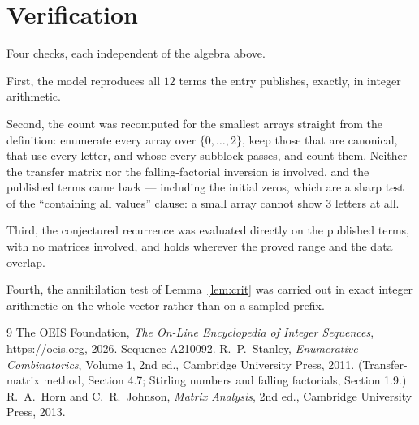 \documentclass[11pt,a4paper]{article}
\theoremstyle{plain}
\theoremstyle{definition}
\begin{document}
\section{Verification}

Four checks, each independent of the algebra above.

First, the model reproduces all $12$ terms the entry publishes, exactly, in integer
arithmetic.

Second, the count was recomputed for the smallest arrays straight from the definition:
enumerate every array over $\{0,\dots,2\}$, keep those that are canonical, that use every
letter, and whose every subblock passes, and count them. Neither the transfer matrix nor the
falling-factorial inversion is involved, and the published terms came back --- including the
initial zeros, which are a sharp test of the ``containing all values'' clause: a small array
cannot show $3$ letters at all.

Third, the conjectured recurrence was evaluated directly on the published terms, with no
matrices involved, and holds wherever the proved range and the data overlap.

Fourth, the annihilation test of Lemma~\ref{lem:crit} was carried out in exact integer
arithmetic on the whole vector rather than on a sampled prefix.

\begin{thebibliography}{9}
 The OEIS Foundation, \emph{The On-Line Encyclopedia of Integer
Sequences}, \url{https://oeis.org}, 2026. Sequence A210092.
 R.~P.~Stanley, \emph{Enumerative Combinatorics}, Volume 1, 2nd ed.,
Cambridge University Press, 2011. (Transfer-matrix method, Section 4.7; Stirling numbers and
falling factorials, Section 1.9.)
 R.~A.~Horn and C.~R.~Johnson, \emph{Matrix Analysis}, 2nd ed., Cambridge
University Press, 2013.
\end{thebibliography}
\end{document}
